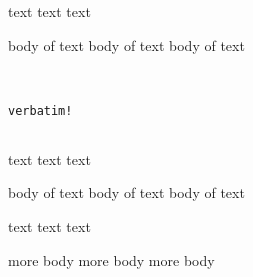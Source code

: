 text text text
\begin{myenv}
  body of text 
  body of text 
  body of text 
   

\end{myenv}



\begin{verbatim}


verbatim!


\end{verbatim}


text text text

\begin{cmh}
  
  
  
  body of text 
  body of text 
  body of text 
\end{cmh}

text text text

\begin{myenv}more body
  more body
more body
\end{myenv}

